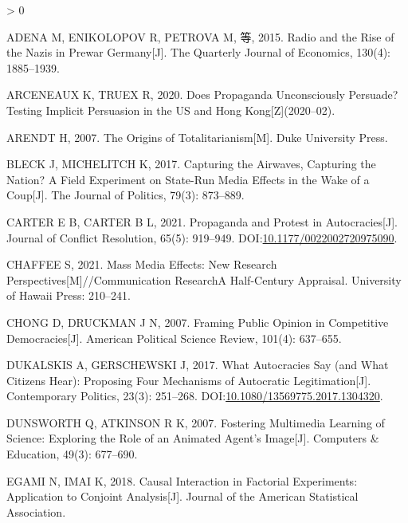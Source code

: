 \documentclass[
  12pt,
]{ctexart}
\newlength{\cslhangindent}
\newenvironment{CSLReferences}[2] %
 {%
  \setlength{\parindent}{0pt}
  \ifodd #1 \everypar{\setlength{\hangindent}{\cslhangindent}}\ignorespaces\fi
  \ifnum #2 > 0
  \setlength{\parskip}{#2\baselineskip}
  \fi
 }%
 {}
\begin{document}
\hypertarget{refs}{}
\begin{CSLReferences}{1}{0}
\leavevmode\hypertarget{ref-AdenaEtAl2015}{}%
ADENA M, ENIKOLOPOV R, PETROVA M, 等, 2015. Radio and the {Rise} of the {Nazis} in {Prewar Germany}{[}J{]}. The Quarterly Journal of Economics, 130(4): 1885--1939.

\leavevmode\hypertarget{ref-ArceneauxTruex2020}{}%
ARCENEAUX K, TRUEX R, 2020. Does {Propaganda Unconsciously Persuade}? {Testing Implicit Persuasion} in the {US} and {Hong Kong}{[}Z{]}(2020--02).

\leavevmode\hypertarget{ref-Arendt2007}{}%
ARENDT H, 2007. The Origins of Totalitarianism{[}M{]}. {Duke University Press}.

\leavevmode\hypertarget{ref-BleckMichelitch2017}{}%
BLECK J, MICHELITCH K, 2017. Capturing the Airwaves, Capturing the Nation? {A} Field Experiment on State-Run Media Effects in the Wake of a Coup{[}J{]}. The Journal of Politics, 79(3): 873--889.

\leavevmode\hypertarget{ref-CarterCarter2021}{}%
CARTER E B, CARTER B L, 2021. Propaganda and {Protest} in {Autocracies}{[}J{]}. Journal of Conflict Resolution, 65(5): 919--949. DOI:\href{https://doi.org/10.1177/0022002720975090}{10.1177/0022002720975090}.

\leavevmode\hypertarget{ref-Chaffee2021}{}%
CHAFFEE S, 2021. Mass Media Effects: {New} Research Perspectives{[}M{]}//Communication Research{{A}} Half-Century Appraisal. {University of Hawaii Press}: 210--241.

\leavevmode\hypertarget{ref-ChongDruckman2007}{}%
CHONG D, DRUCKMAN J N, 2007. Framing Public Opinion in Competitive Democracies{[}J{]}. American Political Science Review, 101(4): 637--655.

\leavevmode\hypertarget{ref-DukalskisGerschewski2017}{}%
DUKALSKIS A, GERSCHEWSKI J, 2017. What Autocracies Say (and What Citizens Hear): Proposing Four Mechanisms of Autocratic Legitimation{[}J{]}. Contemporary Politics, 23(3): 251--268. DOI:\href{https://doi.org/10.1080/13569775.2017.1304320}{10.1080/13569775.2017.1304320}.

\leavevmode\hypertarget{ref-DunsworthAtkinson2007}{}%
DUNSWORTH Q, ATKINSON R K, 2007. Fostering Multimedia Learning of Science: {Exploring} the Role of an Animated Agent's Image{[}J{]}. Computers \& Education, 49(3): 677--690.

\leavevmode\hypertarget{ref-EgamiImai2018}{}%
EGAMI N, IMAI K, 2018. Causal Interaction in Factorial Experiments: {Application} to Conjoint Analysis{[}J{]}. Journal of the American Statistical Association.


\end{CSLReferences}
\end{document}

